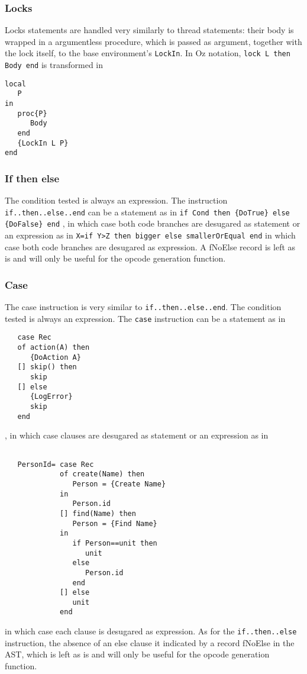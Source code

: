 \documentclass[a4paper]{memoir}
\begin{document}
\subsubsection{Locks}
Locks statements are handled very similarly to thread statements: their body is
wrapped in a argumentless procedure, which is passed as argument, together with
the lock itself, to the base environment's \lstinline!LockIn!. In Oz notation, \lstinline!lock L then Body end! is transformed in
\begin{lstlisting}
local
   P
in
   proc{P}
      Body
   end
   {LockIn L P}
end
\end{lstlisting}


\subsubsection{If then else}
The condition tested is always an expression.
The instruction \lstinline!if..then..else..end! can be a statement as in 
\lstinline!if Cond then {DoTrue} else {DoFalse} end!
, in which case both code branches are desugared as statement
or an expression as in
\lstinline!X=if Y>Z then bigger else smallerOrEqual end!
in which case both code branches are desugared as expression.
A fNoElse record is left as is and will only be useful for the opcode generation function.

\subsubsection{Case}
The case instruction is very similar to \lstinline!if..then..else..end!.
The condition tested is always an expression.
The \lstinline!case! instruction can be a statement as in 
\begin{lstlisting}
   case Rec
   of action(A) then
      {DoAction A}
   [] skip() then
      skip
   [] else
      {LogError}
      skip
   end
\end{lstlisting}
, in which case clauses are desugared as statement
or an expression as in
\begin{lstlisting}
  
   PersonId= case Rec
             of create(Name) then
                Person = {Create Name}
             in
                Person.id
             [] find(Name) then
                Person = {Find Name}
             in
                if Person==unit then
                   unit
                else
                   Person.id
                end
             [] else
                unit
             end
\end{lstlisting}
in which case each clause is desugared as expression.
As for the \lstinline!if..then..else! instruction, the absence of an else clause
it indicated by a record fNoElse in the AST, which is left as is and will only
be useful for the opcode generation function.
\end{document}
